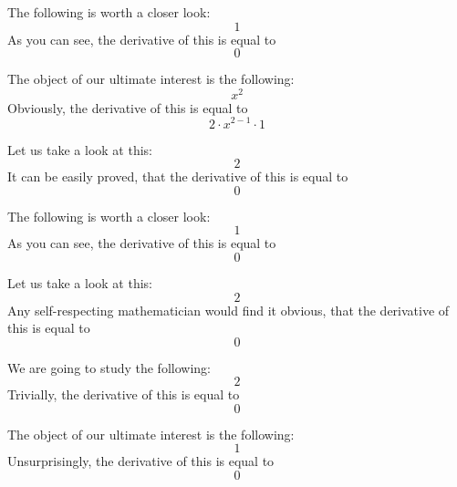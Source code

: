 \documentclass{article}
\begin{document}
The following is worth a closer look:
\begin{equation}
1 
\end{equation}
As you can see, the derivative of this is equal to
\begin{equation}
0 
\end{equation}

The object of our ultimate interest is the following:
\begin{equation}
x ^{2 } 
\end{equation}
Obviously, the derivative of this is equal to
\begin{equation}
2 \cdot x ^{2 - 1 } \cdot 1 
\end{equation}

Let us take a look at this:
\begin{equation}
2 
\end{equation}
It can be easily proved, that the derivative of this is equal to
\begin{equation}
0 
\end{equation}

The following is worth a closer look:
\begin{equation}
1 
\end{equation}
As you can see, the derivative of this is equal to
\begin{equation}
0 
\end{equation}

Let us take a look at this:
\begin{equation}
2 
\end{equation}
Any self-respecting mathematician would find it obvious, that the derivative of this is equal to
\begin{equation}
0 
\end{equation}

We are going to study the following:
\begin{equation}
2 
\end{equation}
Trivially, the derivative of this is equal to
\begin{equation}
0 
\end{equation}

The object of our ultimate interest is the following:
\begin{equation}
1 
\end{equation}
Unsurprisingly, the derivative of this is equal to
\begin{equation}
0 
\end{equation}
\end{document}
